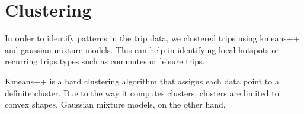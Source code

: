 \section{Clustering}
\label{sec:clustering}

In order to identify patterns in the trip data, we clustered trips using kmeans++ and gaussian mixture models. This can help in identifying local hotspots or recurring trips types such as commutes or leisure trips. 

Kmeans++ is a hard clustering algorithm that assigns each data point to a definite cluster. Due to the way it computes clusters, clusters are limited to convex shapes. Gaussian mixture models, on the other hand, 